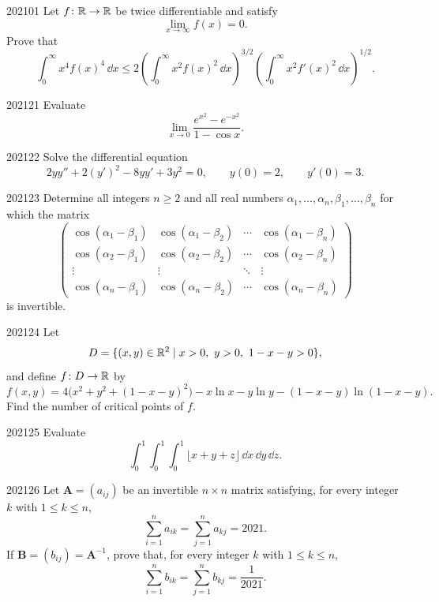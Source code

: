 
\begin{problem}{2021}{0}{1}
Let $f\colon\mathbb{R}\to\mathbb{R}$ be twice differentiable and satisfy
\[
    \lim_{x\to\infty}f(x)=0.
\]
Prove that
\[
    \int_0^\infty x^4 f(x)^4\, \dd x
    \le
    2\left(\int_0^\infty x^2f(x)^2\, \dd x\right)^{3/2}
    \left(\int_0^\infty x^2f'(x)^2\, \dd x\right)^{1/2}.
\]
\end{problem}

\begin{problem}{2021}{2}{1}
Evaluate
\[
    \lim_{x\to0}
    \frac{e^{x^2}-e^{-x^2}}{1-\cos x}.
\]
\end{problem}

\begin{problem}{2021}{2}{2}
Solve the differential equation
\[
    2y y''+2(y')^2-8y y'+3y^2=0,
    \qquad
    y(0)=2,
    \qquad
    y'(0)=3.
\]
\end{problem}

\begin{problem}{2021}{2}{3}
Determine all integers $n\ge2$ and all real numbers
$\alpha_1, \dots, \alpha_n, \beta_1, \dots, \beta_n$ for which the matrix
\[
    \begin{pmatrix}
        \cos(\alpha_1-\beta_1) & \cos(\alpha_1-\beta_2) & \cdots & \cos(\alpha_1-\beta_n)\\
        \cos(\alpha_2-\beta_1) & \cos(\alpha_2-\beta_2) & \cdots & \cos(\alpha_2-\beta_n)\\
        \vdots & \vdots & \ddots & \vdots\\
        \cos(\alpha_n-\beta_1) & \cos(\alpha_n-\beta_2) & \cdots & \cos(\alpha_n-\beta_n)
    \end{pmatrix}
\]
is invertible.
\end{problem}

\begin{problem}{2021}{2}{4}
Let
\[
    D=\{(x, y)\in\R^2\mid x>0, \ y>0, \ 1-x-y>0\},
\]
and define $f\colon D\to\mathbb{R}$ by
\[
    f(x, y)
    =4\bigl(x^2+y^2+(1-x-y)^2\bigr)
    -x\ln x-y\ln y-(1-x-y)\ln(1-x-y).
\]
Find the number of critical points of $f$.
\end{problem}

\begin{problem}{2021}{2}{5}
Evaluate
\[
    \int_0^1\int_0^1\int_0^1
    \lfloor x+y+z\rfloor\, \dd x\, \dd y\, \dd z.
\]
\end{problem}

\begin{problem}{2021}{2}{6}
Let $\mathbf A=(a_{ij})$ be an invertible $n\times n$ matrix satisfying, for every integer $k$ with $1\le k\le n$,
\[
    \sum_{i=1}^n a_{ik}
    =
    \sum_{j=1}^n a_{kj}
    =2021.
\]
If $\mathbf B=(b_{ij})=\mathbf A^{-1}$, prove that, for every integer $k$ with $1\le k\le n$,
\[
    \sum_{i=1}^n b_{ik}
    =
    \sum_{j=1}^n b_{kj}
    =\frac1{2021}.
\]
\end{problem}

